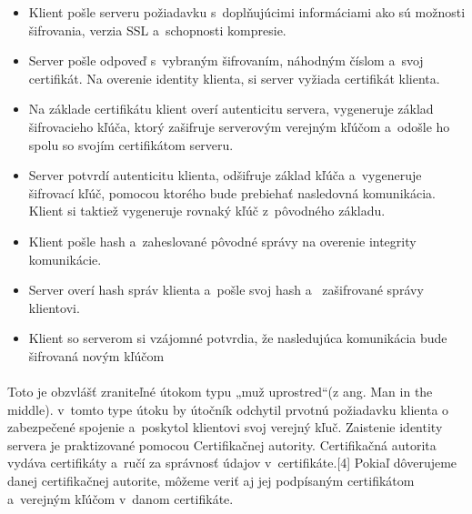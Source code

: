 \documentclass[
  printed, %
  notable,   %
  nolof,     %
    oneside,       %
  nolot,     %
]{fithesis3}
\begin{document}
\begin{itemize}

\item Klient pošle serveru požiadavku s~doplňujúcimi informáciami ako sú možnosti šifrovania, verzia SSL a~schopnosti kompresie.
\item Server pošle odpoveď s~vybraným šifrovaním, náhodným číslom a~svoj certifikát. Na overenie identity klienta, si server vyžiada certifikát klienta.
\item Na základe certifikátu klient overí autenticitu servera, vygeneruje základ šifrovacieho kľúča, ktorý zašifruje serverovým verejným kľúčom a~odošle ho spolu so svojím certifikátom serveru.
\item Server potvrdí autenticitu klienta, odšifruje základ kľúča a~vygeneruje šifrovací kľúč, pomocou ktorého bude prebiehať nasledovná komunikácia. Klient si  taktiež vygeneruje rovnaký kľúč z~pôvodného základu.
\item Klient pošle hash a~zaheslované pôvodné správy na overenie integrity komunikácie.
\item Server overí hash správ klienta a~pošle svoj hash a~ zašifrované správy klientovi.  
\item Klient so serverom si vzájomné potvrdia, že nasledujúca komunikácia bude šifrovaná novým kľúčom 

\end{itemize}
\paragraph{}
Toto je obzvlášť zraniteľné útokom typu „muž uprostred“(z ang. Man in the middle). v~tomto type útoku by útočník odchytil prvotnú požiadavku klienta o zabezpečené spojenie a~poskytol klientovi svoj verejný kľuč. Zaistenie identity servera je praktizované pomocou Certifikačnej autority.  Certifikačná autorita vydáva certifikáty a~ručí za správnosť údajov v~certifikáte.[4] Pokiaľ dôverujeme danej certifikačnej autorite, môžeme veriť aj jej podpísaným certifikátom  a~verejným kľúčom v~danom certifikáte. 
\end{document}
